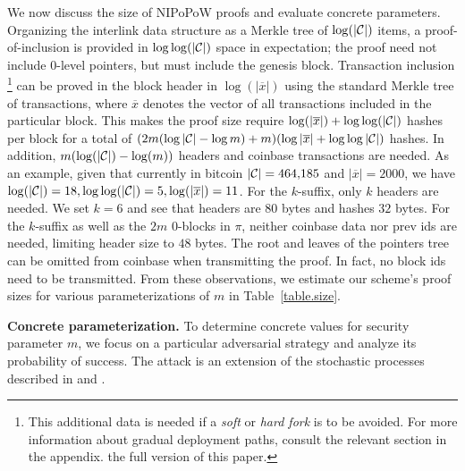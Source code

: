 We now discuss the size of NIPoPoW proofs and evaluate concrete parameters.
Organizing the interlink data structure as a Merkle tree of $\log(|\mathcal{C}|)$ items, a
proof-of-inclusion is provided in $\log \log(|\mathcal{C}|)$ space in expectation;
the proof need not include $0$-level pointers, but must include the genesis
block.
Transaction inclusion
\footnote{This additional data is needed if a \emph{soft} or \emph{hard fork} is
to be avoided. For more information about gradual deployment paths, consult the
relevant section in
\ifhasappendix
the appendix.
\else
the full version of this paper.
\fi}
can be proved in the block header in
$\log(|\overline x|)$ using the standard Merkle tree of transactions, where
$\overline x$ denotes the vector of all transactions included in the particular
block.
This makes the proof size require $\log(|\overline x|) +
\log\log(|\mathcal{C}|)$ hashes per block for a total of
$(2m (\log|\mathcal{C}| - \log{m}) + m)(\log|\overline x| + \log\log|\mathcal{C}|)$
hashes. In addition, $m
(\log(|\mathcal{C}|) - \log(m))$ headers and coinbase transactions are needed. As an
example, given that currently in bitcoin $|\mathcal{C}| = 464{,}185$ and $|\overline x|
= 2000$, we have $\log(|\mathcal{C}|) = 18, \log\log(|\mathcal{C}|) = 5, \log(|\overline
x|) = 11$. For the $k$-suffix, only $k$ headers are needed. We set $k = 6$ and
see that headers are $80$ bytes and hashes $32$ bytes. For the $k$-suffix as
well as the $2m$ $0$-blocks in $\pi$, neither coinbase data nor prev ids are
needed, limiting header size to $48$ bytes. The root and leaves of the pointers
tree can be omitted from coinbase when transmitting the proof. In fact, no block
ids need to be transmitted. From these observations, we estimate our scheme's
proof sizes for various parameterizations of $m$ in Table~\ref{table.size}.

\noindent
\textbf{Concrete parameterization.}
To determine concrete values for security parameter $m$, we focus on a
particular adversarial strategy and analyze its probability of success.
The attack is an extension of the stochastic processes described in
\cite{bitcoin} and \cite{rosenfeld}.

